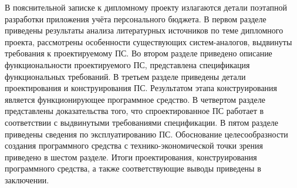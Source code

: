 В пояснительной записке к дипломному проекту излагаются детали поэтапной разработки приложения учёта персонального бюджета.
В первом разделе приведены результаты анализа литературных источников по теме дипломного проекта, рассмотрены особенности существующих систем-аналогов, выдвинуты требования к проектируемому ПС.
Во втором разделе приведено описание функциональности проектируемого ПС, представлена спецификация функциональных требований.
В третьем разделе приведены детали проектирования и конструирования ПС.
Результатом этапа конструирования является функционирующее программное средство.
В четвертом разделе представлены доказательства того, что спроектированное ПС работает в соответствии с выдвинутыми требованиями спецификации.
В пятом разделе приведены сведения по эксплуатированию ПС.
Обоснование целесообразности создания программного средства с технико-экономической точки зрения приведено в шестом разделе.
Итоги проектирования, конструирования программного средства, а также соответствующие выводы приведены в заключении.